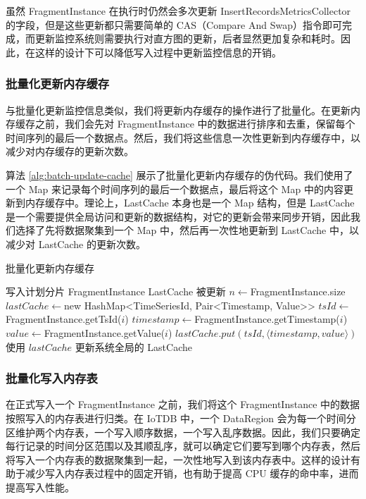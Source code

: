 虽然 FragmentInstance 在执行时仍然会多次更新 InsertRecordsMetricsCollector 的字段，但是这些更新都只需要简单的 CAS（Compare And Swap）指令即可完成，而更新监控系统则需要执行对直方图的更新，后者显然更加复杂和耗时。因此，在这样的设计下可以降低写入过程中更新监控信息的开销。
\subsubsection{批量化更新内存缓存}
与批量化更新监控信息类似，我们将更新内存缓存的操作进行了批量化。在更新内存缓存之前，我们会先对 FragmentInstance 中的数据进行排序和去重，保留每个时间序列的最后一个数据点。然后，我们将这些信息一次性更新到内存缓存中，以减少对内存缓存的更新次数。

算法 \ref{alg:batch-update-cache} 展示了批量化更新内存缓存的伪代码。我们使用了一个 Map 来记录每个时间序列的最后一个数据点，最后将这个 Map 中的内容更新到内存缓存中。理论上，LastCache 本身也是一个 Map 结构，但是 LastCache 是一个需要提供全局访问和更新的数据结构，对它的更新会带来同步开销，因此我们选择了先将数据聚集到一个 Map 中，然后再一次性地更新到 LastCache 中，以减少对 LastCache 的更新次数。
\begin{algorithm}
  \caption{批量化更新内存缓存}
  \label{alg:batch-update-cache}
  \small
  \begin{algorithmic}
    \REQUIRE 写入计划分片 FragmentInstance
    \ENSURE LastCache 被更新
    \STATE $n \leftarrow $FragmentInstance.size
    \STATE $lastCache \leftarrow $new HashMap<TimeSeriesId, Pair<Timestamp, Value>>
    \STATE $tsId \leftarrow $FragmentInstance.getTsId($i$)
    \STATE $timestamp \leftarrow $FragmentInstance.getTimestamp($i$)
    \STATE $value \leftarrow $FragmentInstance.getValue($i$)
    \STATE $lastCache.put(tsId, \langle timestamp, value \rangle)$
    \ENDIF
    \ENDFOR
    \STATE 使用 $lastCache$ 更新系统全局的 LastCache
  \end{algorithmic}
\end{algorithm}
\subsubsection{批量化写入内存表}
在正式写入一个 FragmentInstance 之前，我们将这个 FragmentInstance 中的数据按照写入的内存表进行归类。在 IoTDB 中，一个 DataRegion 会为每一个时间分区维护两个内存表，一个写入顺序数据，一个写入乱序数据。因此，我们只要确定每行记录的时间分区范围以及其顺乱序，就可以确定它们要写到哪个内存表，然后将写入一个内存表的数据聚集到一起，一次性地写入到该内存表中。这样的设计有助于减少写入内存表过程中的固定开销，也有助于提高 CPU 缓存的命中率，进而提高写入性能。
